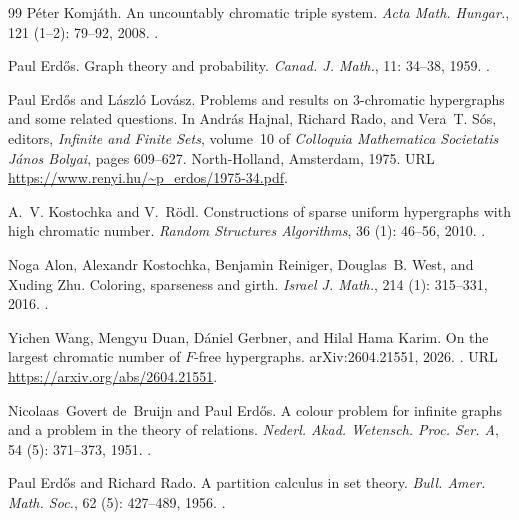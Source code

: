 \documentclass[a4paper,11pt,reqno]{amsart}
\theoremstyle{plain}
\theoremstyle{definition}
\theoremstyle{remark}
\begin{document}
\begin{thebibliography}{99}
P{\'e}ter Komj{\'a}th.
\newblock An uncountably chromatic triple system.
\newblock \emph{Acta Math. Hungar.}, 121 (1--2):
  79--92, 2008.
\newblock {}.

Paul Erd{\H{o}}s.
\newblock Graph theory and probability.
\newblock \emph{Canad. J. Math.}, 11: 34--38, 1959.
\newblock {}.

Paul Erd{\H{o}}s and L{\'a}szl{\'o} Lov{\'a}sz.
\newblock Problems and results on 3-chromatic hypergraphs and some related questions.
\newblock In Andr{\'a}s Hajnal, Richard Rado, and Vera~T. S{\'o}s, editors,
  \emph{Infinite and Finite Sets}, volume~10 of \emph{Colloquia Mathematica
  Societatis J{\'a}nos Bolyai}, pages 609--627. North-Holland, Amsterdam, 1975.
\newblock URL \url{https://www.renyi.hu/~p_erdos/1975-34.pdf}.

A.~V. Kostochka and V.~R{\"o}dl.
\newblock Constructions of sparse uniform hypergraphs with high chromatic number.
\newblock \emph{Random Structures Algorithms}, 36 (1): 46--56, 2010.
\newblock {}.

Noga Alon, Alexandr Kostochka, Benjamin Reiniger, Douglas~B. West, and Xuding Zhu.
\newblock Coloring, sparseness and girth.
\newblock \emph{Israel J. Math.}, 214 (1): 315--331, 2016.
\newblock {}.

Yichen Wang, Mengyu Duan, D{\'a}niel Gerbner, and Hilal Hama Karim.
\newblock On the largest chromatic number of {$F$}-free hypergraphs.
\newblock arXiv:2604.21551, 2026.
\newblock {}.
\newblock URL \url{https://arxiv.org/abs/2604.21551}.

Nicolaas~Govert de~Bruijn and Paul Erd{\H{o}}s.
\newblock A colour problem for infinite graphs and a problem in the theory of
  relations.
\newblock \emph{Nederl. Akad. Wetensch. Proc. Ser. A}, 54
  (5): 371--373, 1951.
\newblock {}.

Paul Erd{\H{o}}s and Richard Rado.
\newblock A partition calculus in set theory.
\newblock \emph{Bull. Amer. Math. Soc.}, 62
  (5): 427--489, 1956.
\newblock {}.


\end{thebibliography}
\end{document}
